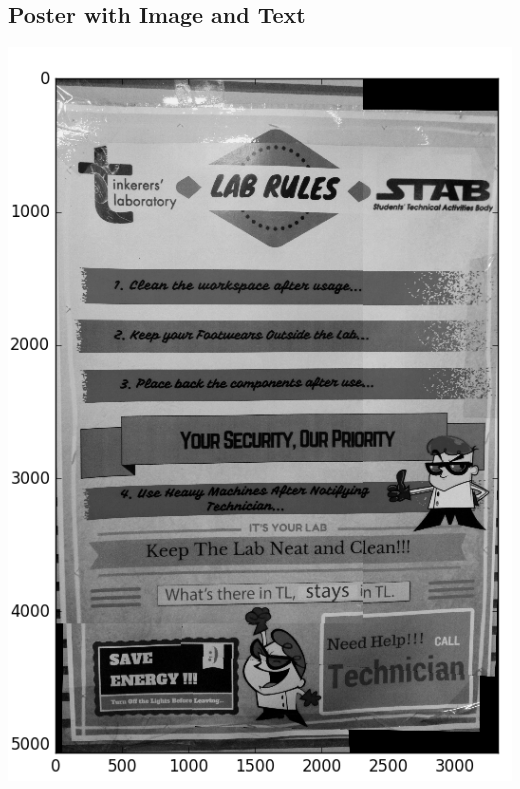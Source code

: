 \documentclass{article}
\begin{document}
\subsection*{Poster with Image and Text}
\includegraphics[scale=0.25]{lab_rules/figure_1}
\end{document}
